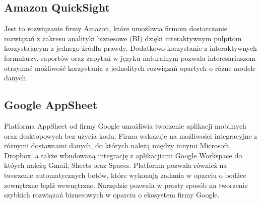 \subsection{Amazon QuickSight}
Jest to rozwiązanie firmy Amazon, które umożliwia firmom dostarczanie rozwiązań z zakresu analityki biznesowe (BI) dzięki interaktywnym pulpitom korzystającym z jednego źródła prawdy. Dodatkowo korzystanie z interaktywnych formularzy, raportów oraz zapytań w języku naturalnym pozwala interesariuszom otrzymać możliwość korzystania z jednolitych rozwiązań opartych o różne modele danych\cite{AmazonQuickSight}.

\subsection{Google AppSheet}
Platforma AppSheet od firmy Google umożliwia tworzenie aplikacji mobilnych oraz desktopowych bez użycia kodu. Firma wskazuje na możliwości integracyjne z różnymi dostawcami danych, do których należą między innymi Microsoft, Dropbox, a także wbudowaną integrację z aplikacjiami Google Workspace do któych należą Gmail, Sheets oraz Spaces. Platforma pozwala również na tworzenie automatycznych botów, które wykonują zadania w oparciu o bodźce zewnętrzne bądź wewnętrzne. Narzędzie pozwala w prosty sposób na tworzenie szybkich rozwiązań biznesowych w oparciu o ekosystem firmy Google\cite{GoogleAppSheet}.


